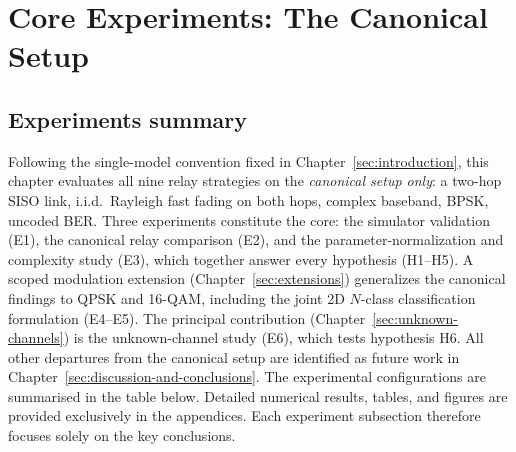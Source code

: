 \chapter{Core Experiments: The Canonical Setup}\label{sec:experiments}

\section{Experiments summary}\label{sec:experiments-summary}

Following the single-model convention fixed in Chapter~\ref{sec:introduction}, this chapter evaluates all nine relay strategies on the \emph{canonical setup only}: a two-hop SISO link, i.i.d.\ Rayleigh fast fading on both hops, complex baseband, BPSK, uncoded BER. Three experiments constitute the core: the simulator validation (E1), the canonical relay comparison (E2), and the parameter-normalization and complexity study (E3), which together answer every hypothesis (H1--H5). A scoped modulation extension (Chapter~\ref{sec:extensions}) generalizes the canonical findings to QPSK and 16-QAM, including the joint 2D $N$-class classification formulation (E4--E5). The principal contribution (Chapter~\ref{sec:unknown-channels}) is the unknown-channel study (E6), which tests hypothesis H6. All other departures from the canonical setup are identified as future work in Chapter~\ref{sec:discussion-and-conclusions}.
The experimental configurations are summarised in the table below.
Detailed numerical results, tables, and figures are provided exclusively in the appendices.
Each experiment subsection therefore focuses solely on the key conclusions.

